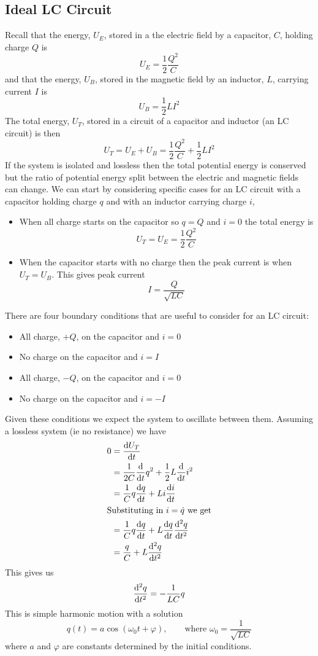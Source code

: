 \documentclass{article}
\begin{document}
    \subsection{Ideal LC Circuit}
    Recall that the energy, \(U_E\), stored in a the electric field by a capacitor, \(C\), holding charge \(Q\) is
    \[U_E = \frac{1}{2}\frac{Q^2}{C}\]
    and that the energy, \(U_B\), stored in the magnetic field by an inductor, \(L\), carrying current \(I\) is
    \[U_B = \frac{1}{2}LI^2\]
    The total energy, \(U_T\), stored in a circuit of a capacitor and inductor (an LC circuit) is then
    \[U_T = U_E + U_B = \frac{1}{2}\frac{Q^2}{C} + \frac{1}{2}LI^2\]
    If the system is isolated and lossless then the total potential energy is conserved but the ratio of potential energy split between the electric and magnetic fields can change.
    We can start by considering specific cases for an LC circuit with a capacitor holding charge \(q\) and with an inductor carrying charge \(i\),
    \begin{itemize}
        \item When all charge starts on the capacitor so \(q = Q\) and \(i = 0\) the total energy is
        \[U_T = U_E = \frac{1}{2}\frac{Q^2}{C}\]
        \item When the capacitor starts with no charge then the peak current is when \(U_T = U_B\).
        This gives peak current
        \[I = \frac{Q}{\sqrt{LC}}\]
    \end{itemize}
    There are four boundary conditions that are useful to consider for an LC circuit:
    \begin{itemize}
        \item All charge, \(+Q\), on the capacitor and \(i = 0\)
        \item No charge on the capacitor and \(i = I\)
        \item All charge, \(-Q\), on the capacitor and \(i = 0\)
        \item No charge on the capacitor and \(i = -I\)
    \end{itemize}
    Given these conditions we expect the system to oscillate between them.
    Assuming a lossless system (ie no resistance) we have
    \begin{align*}
        0 &= \dv{U_T}{t}\\
        &= \frac{1}{2C}\dv{t}q^2 + \frac{1}{2}L\dv{t}i^2\\
        &= \frac{1}{C}q\dv{q}{t} + Li\dv{i}{t}\\
        \intertext{Substituting in \(i = \dot q\) we get}
        &= \frac{1}{C}q\dv{q}{t} + L\dv{q}{t}\dv[2]{q}{t}\\
        &= \frac{q}{C} + L\dv[2]{q}{t}
    \end{align*}
    This gives us
    \[\dv[2]{q}{t} = -\frac{1}{LC}q\]
    This is simple harmonic motion with a solution
    \[q(t) = a\cos(\omega_0 t + \varphi),\qquad\text{where }\omega_0 = \frac{1}{\sqrt{LC}}\]
    where \(a\) and \(\varphi\) are constants determined by the initial conditions.
    
\end{document}
